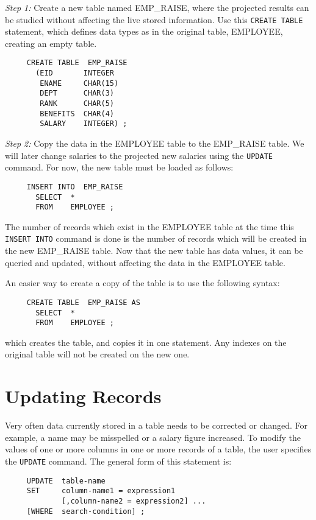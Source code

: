 {\em Step 1:} Create a new table named EMP\_RAISE, where the projected
results can be studied without affecting the live stored information.
Use this {\tt CREATE TABLE} statement, which defines data types as in the
original table, EMPLOYEE, creating an empty table.

\begin{verbatim}
     CREATE TABLE  EMP_RAISE
       (EID       INTEGER
        ENAME     CHAR(15)
        DEPT      CHAR(3)
        RANK      CHAR(5)
        BENEFITS  CHAR(4)
        SALARY    INTEGER) ;
\end{verbatim}

{\em Step 2:} Copy the data in the EMPLOYEE table to the EMP\_RAISE
table.  We will later change salaries to the projected new salaries
using the \verb`UPDATE` command.  For now, the new table must be loaded as
follows:

\begin{verbatim}
     INSERT INTO  EMP_RAISE
       SELECT  *
       FROM    EMPLOYEE ;
\end{verbatim}

The number of records which exist in the EMPLOYEE table at the time
this {\tt INSERT INTO} command is done is the number of records which will
be created in the new EMP\_RAISE table.  Now that the new table has
data values, it can be queried and updated, without affecting the data
in the EMPLOYEE table.

An easier way to create a copy of the table is to use the following
syntax:

\begin{verbatim}
     CREATE TABLE  EMP_RAISE AS
       SELECT  *
       FROM    EMPLOYEE ;
\end{verbatim}

which creates the table, and copies it in one statement.  Any indexes
on the original table will not be created on the new one.

\section{Updating Records}

Very often data currently stored in a table needs to be corrected or
changed.  For example, a name may be misspelled or a salary figure
increased.  To modify the values of one or more columns in one or more
records of a table, the user specifies the \verb`UPDATE` command.  The
general form of this statement is:

\begin{verbatim}
     UPDATE  table-name
     SET     column-name1 = expression1
             [,column-name2 = expression2] ...
     [WHERE  search-condition] ;
\end{verbatim}

